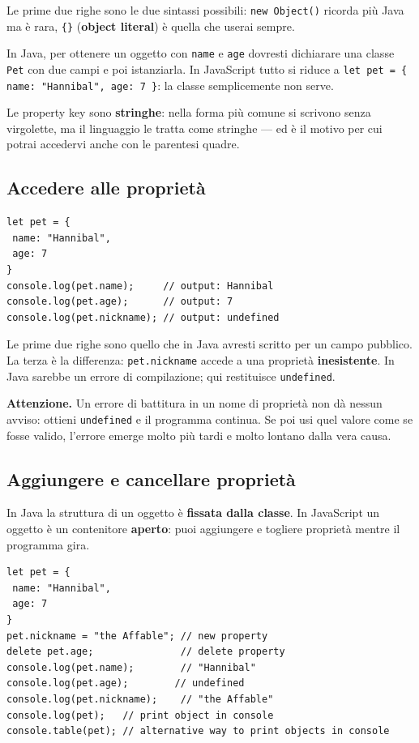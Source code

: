 \documentclass[10pt,a4paper]{article}
\newcommand{\avviso}[1]{\textbf{\textcolor{wamber}{Attenzione.}} #1}
\begin{document}
Le prime due righe sono le due sintassi possibili: \texttt{new Object()} ricorda più Java ma è rara, \texttt{\{\}} (\textbf{object literal}) è quella che userai sempre.

In Java, per ottenere un oggetto con \texttt{name} e \texttt{age} dovresti dichiarare una classe \texttt{Pet} con due campi e poi istanziarla. In JavaScript tutto si riduce a \texttt{let pet = \{ name: "Hannibal", age: 7 \}}: la classe semplicemente non serve.

Le property key sono \textbf{stringhe}: nella forma più comune si scrivono senza virgolette, ma il linguaggio le tratta come stringhe --- ed è il motivo per cui potrai accedervi anche con le parentesi quadre.

\subsection{Accedere alle proprietà}

\begin{lstlisting}[style=js]
let pet = {
 name: "Hannibal",
 age: 7
}
console.log(pet.name);     // output: Hannibal
console.log(pet.age);      // output: 7
console.log(pet.nickname); // output: undefined
\end{lstlisting}

Le prime due righe sono quello che in Java avresti scritto per un campo pubblico. La terza è la differenza: \texttt{pet.nickname} accede a una proprietà \textbf{inesistente}. In Java sarebbe un errore di compilazione; qui restituisce \texttt{undefined}.

\begin{warnbox}
\avviso{Un errore di battitura in un nome di proprietà non dà nessun avviso: ottieni \texttt{undefined} e il programma continua. Se poi usi quel valore come se fosse valido, l'errore emerge molto più tardi e molto lontano dalla vera causa.}
\end{warnbox}

\subsection{Aggiungere e cancellare proprietà}

In Java la struttura di un oggetto è \textbf{fissata dalla classe}. In JavaScript un oggetto è un contenitore \textbf{aperto}: puoi aggiungere e togliere proprietà mentre il programma gira.

\begin{lstlisting}[style=js]
let pet = {
 name: "Hannibal",
 age: 7
}
pet.nickname = "the Affable"; // new property
delete pet.age;               // delete property
console.log(pet.name);        // "Hannibal"
console.log(pet.age);        // undefined
console.log(pet.nickname);    // "the Affable"
console.log(pet);   // print object in console
console.table(pet); // alternative way to print objects in console
\end{lstlisting}
\end{document}
